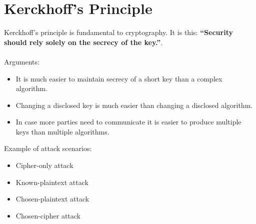 \section{Kerckhoff's Principle}
    Kerckhoff's principle is fundamental to cryptography. It is this: \textbf{``Security should rely solely on the secrecy of the key.''}.\\
    \\
    Arguments:
    \begin{itemize}
      \item It is much easier to maintain secrecy of a short key than a complex algorithm.
      \item Changing a disclosed key is much easier than changing a disclosed algorithm.
      \item In case more parties need to communicate it is easier to produce multiple keys than multiple algorithms.
    \end{itemize}
    Example of attack scenarios:
    \begin{itemize}
      \item Cipher-only attack
      \item Known-plaintext attack
      \item Chosen-plaintext attack
      \item Chosen-cipher attack
    \end{itemize}


